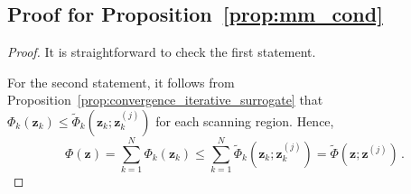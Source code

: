 \documentclass{article}
\numberwithin{equation}{section}
\begin{document}
\subsection{Proof for Proposition~\ref{prop:mm_cond}}\label{app:proof_mm_cond}
\begin{proof}
     It is straightforward to check the first statement.  
     
     For the second statement, it follows from Proposition~\ref{prop:convergence_iterative_surrogate} that  $\Phi_k\left(\bm{z}_k\right) \leq \widetilde{\Phi}_k\left(\bm{z}_k ; \bm{z}_k^{(j)}\right)$ for each scanning region.  Hence,
     \begin{equation*}
         \Phi\left(\bm{z}\right)=\sum_{k=1}^N\Phi_k\left(\bm{z}_k\right) \leq \sum_{k=1}^N\widetilde{\Phi}_k\left(\bm{z}_k ; \bm{z}_k^{(j)}\right)=\widetilde{\Phi}\left(\bm{z} ; \bm{z}^{(j)}\right)\,.
     \end{equation*}


\end{proof}
\end{document}
